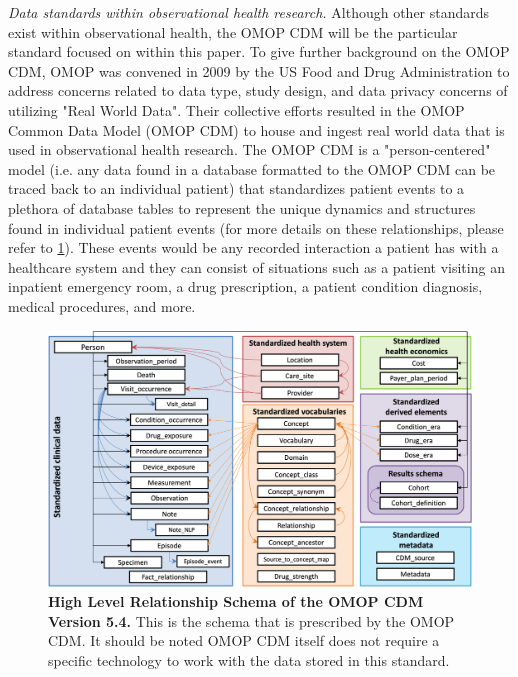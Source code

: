 \documentclass{juliacon}
\begin{document}
\textit{Data standards within observational health research.}
Although other standards exist within observational health, the OMOP CDM will be the particular standard focused on within this paper.
To give further background on the OMOP CDM, OMOP was convened in 2009 by the US Food and Drug Administration to address concerns related to data type, study design, and data privacy concerns of utilizing "Real World Data". \cite{ohdsi2019book} \cite{FDARealWorldEvidence}
Their collective efforts resulted in the OMOP Common Data Model (OMOP CDM) to house and ingest real world data that is used in observational health research.
The OMOP CDM is a "person-centered" model (i.e. any data found in a database formatted to the OMOP CDM can be traced back to an individual patient) that standardizes patient events to a plethora of database tables to represent the unique dynamics and structures found in individual patient events (for more details on these relationships, please refer to \ref{fig:cdm}).
These events would be any recorded interaction a patient has with a healthcare system and they can consist of situations such as a patient visiting an inpatient emergency room, a drug prescription, a patient condition diagnosis, medical procedures, and more.

\begin{figure}[!ht]
\centering
\includegraphics[scale = 0.6]{omop_cdm.png}
\caption{\textbf{High Level Relationship Schema of the OMOP CDM Version 5.4.} This is the schema that is prescribed by the OMOP CDM. It should be noted OMOP CDM itself does not require a specific technology to work with the data stored in this standard.}
\label{fig:cdm}
\end{figure}
\end{document}
